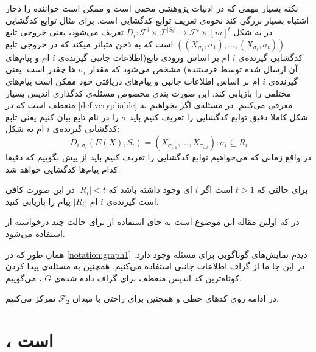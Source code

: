 \begin{remark}
	\label{remark:pliablevsvery}
	نکته بسیار مهمی که در ادبیات پژوهشی 
	\picod
	مخفی است و ممکن است خواننده را دچار اشتباه بسیار بزرگی کند نحوه‌ی تعریف توابع کدگشایی است. برای مثال توابع کدگشایی در
	\cite{song2017polynomialtime}
	به شکل
	$D_i: \mathcal{F}^l \times \mathcal{F}^{|S_i|} \rightarrow \mathcal{F}^t \times [m]^t$
	تعریف می‌شود، یعنی خروجی تابع
	$((X_{\sigma_1}, \sigma_1), \ldots, (X_{\sigma_t}, \sigma_t) )$
	است که به ذخن متباتر میکند که در خروجی تابع کدگشایی گیرنده‌ی 
	$i$
	ام بر اساس ورودی تابع(اطلاعات جانبی گیرنده‌ی 
	$i$
	ام و پیام‌های آن ارسال شده توسط فرستنده) مشخص می‌شود که مقدار
	$\sigma_i$
	ها چقدر است. یعنی گیرنده‌ی
	$i$
	ام بر اساس اطلاعات جانبی و پیام‌های دریافتی خود ممکن است پیام‌های مختلفی را بازیابی کند. این صورت بندی مخصوص مسئله‌ی کدگذاری اندیس بسیار منعطف است که در
	\autoref{def:verypliable}
	معرفی می‌کنیم. در مسئله‌ی
	\picod
	اگر بخواهیم به شکل کاملا دقیق توابع کدگشایی را تعریف کنیم باید 
	$\sigma$
	 را در نام تابع بیان کنیم یعنی تابع کدگشایی گیرنده‌ی
	 $i$
	 ام به شکل:
	 	$$D_{i, \sigma_i}(E(X), S_i) = (X_{\sigma_{i,1}}, \ldots, X_{\sigma_{i,t}}): \sigma_i \subseteq R_i $$
	 	در واقع زمانی که می‌خواهیم توابع کدگشایی را تعریف کنیم باید از پیش بگوییم که دقیقا کدام پیام‌ها کدگشایی خواهد شد.
\end{remark}

\begin{note}
	برای حالتی که
	$t > 1$
	است اگر
	$i$
	ای وجود داشته باشد که
	$|R_i| < t$
	در این صورت کافی است گیرنده‌ی 
	$i$
	ام
	$|R_i|$
	پیام را بازیابی کنید.
	\cite{pliablefirstpaper}
\end{note}

\begin{note}
	در 
	\cite{pliablefirstpaper}
	که اولین مقاله این موضوع است به جای استفاده از
	\picodt
	برای حالت چند درخواسته از
	استفاده می‌شود.
\end{note}
\begin{notation}
	همان طور که در
	\autoref{notation:graph1}
	دیدم نمایش‌های گوناگوبی برای مسئله وجود دارد. در این جا ما از گراف اطلاعات جانبی استفاده می‌کنیم. همچنین به مسئله‌ی پیدا کردن کوتاه‌ترین کد اندیس منعطف برای گراف داده شده‌ی 
	$G$
	،
	\picodg
	می‌گوییم.
\end{notation}


در ادامه روی کدهای خطی و همچنین برای راحتی با میدان
$\mathcal{F}_2$
تمرکز می‌کنیم.

\section{
\lpicod
،
\nphard
 است
}

